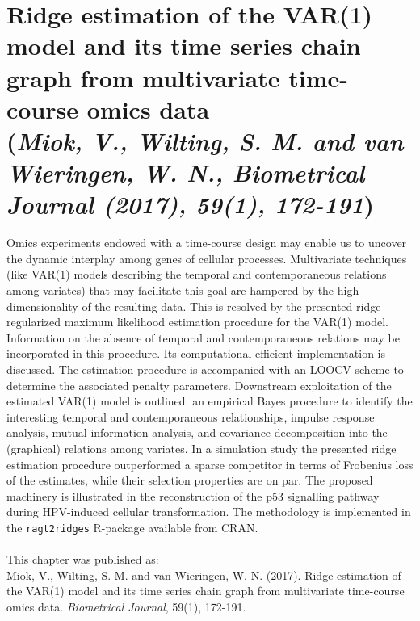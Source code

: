 \chapter{Ridge estimation of the VAR(1) model and its time series chain graph from multivariate time-course omics data \\ {\footnotesize (\textit{Miok, V., Wilting, S. M. and van Wieringen, W. N., Biometrical Journal (2017), 59(1), 172-191})}}
\label{ch3:ragt2ridges}
\label{chapter:Estimating entropy loss in Gaussian graphical models}
\graphicspath{{Chapter3/Figs/}{Chapter3/Figs/PDF/}{Chapter3/Figs/}}%

Omics experiments endowed with a time-course design may enable us to uncover the dynamic interplay among genes of cellular processes. Multivariate techniques (like VAR(1) models describing the temporal and contemporaneous relations among variates) that may facilitate this goal are hampered by the high-dimensionality of the resulting data. This is resolved by the presented ridge regularized  maximum likelihood estimation procedure for the VAR(1) model. Information on the absence of temporal and contemporaneous relations may be incorporated in this procedure. Its computational efficient implementation is discussed. The estimation procedure is accompanied with an LOOCV scheme to determine the associated penalty parameters. Downstream exploitation of the estimated VAR(1) model is outlined: an empirical Bayes procedure to identify the interesting temporal and contemporaneous  relationships, impulse response analysis, mutual information analysis, and covariance decomposition into the (graphical) relations among variates. In a simulation study the presented ridge estimation procedure outperformed a sparse competitor in terms of Frobenius loss of the estimates, while their selection properties are on par. The proposed machinery is illustrated in the reconstruction of the p53 signalling pathway during HPV-induced cellular transformation. The methodology is implemented in the \texttt{ragt2ridges} R-package available from CRAN.
\\
\\
This chapter was published as:\\
Miok, V., Wilting, S. M. and van Wieringen, W. N. (2017). Ridge estimation of the VAR(1) model and its time series chain graph from multivariate time-course omics data. \textit{Biometrical Journal}, 59(1), 172-191.

